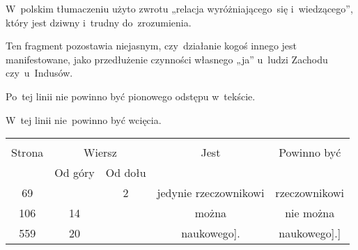 \documentclass[a4paper,11pt]{article}
\begin{document}
\start {} W~polskim tłumaczeniu użyto zwrotu „relacja
wyróżniającego~się i~wiedzącego”, który jest dziwny i~trudny
do~zrozumienia.

\vspace{\spaceFour}





\start {} Ten fragment pozostawia niejasnym,
czy~działanie kogoś innego jest manifestowane, jako przedłużenie
czynności własnego „ja” u~ludzi Zachodu czy~u~Indusów.

\vspace{\spaceFour}





\start {} Po~tej linii nie powinno być pionowego odstępu
w~tekście.

\vspace{\spaceFour}





\start {} W~tej linii nie~powinno być wcięcia.







\begin{center}

  \begin{tabular}{|c|c|c|c|c|}
    \hline
    & \multicolumn{2}{c|}{} & & \\
    Strona & \multicolumn{2}{c|}{Wiersz} & Jest
                              & Powinno być \\ \cline{2-3}
    & Od góry & Od dołu & & \\
    \hline
    69  & &  2 & jedynie rzeczownikowi & rzeczownikowi \\
    106 & 14 & & można & nie można \\
    559 & 20 & & naukowego]. & naukowego].] \\
    \hline
  \end{tabular}

\end{center}


\vspace{\spaceTwo}
\end{document}
